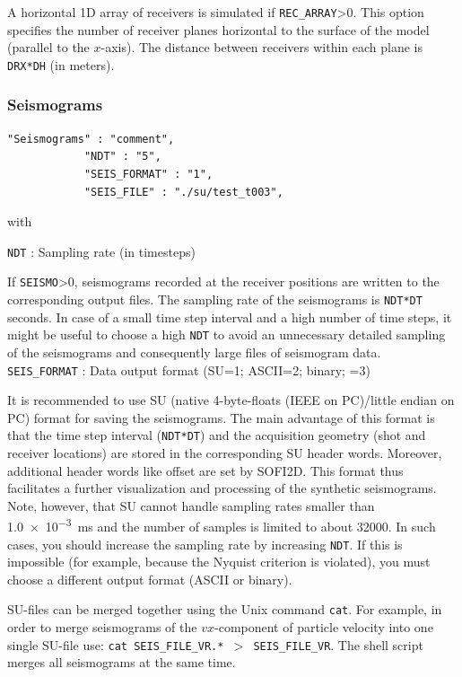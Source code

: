 A horizontal 1D array of receivers is simulated if \texttt{REC\_ARRAY}>0. This option specifies the number of receiver planes horizontal to the surface of the model (parallel to the $x$-axis). The distance between receivers within each plane is \texttt{DRX*DH} (in meters).

\subsubsection{Seismograms}
\label{seismograms}
\begin{verbatim}
"Seismograms" : "comment",
            "NDT" : "5",
            "SEIS_FORMAT" : "1",
            "SEIS_FILE" : "./su/test_t003",
\end{verbatim}

with

\texttt{NDT} : Sampling rate (in timesteps)

If \texttt{SEISMO}>0, seismograms recorded at the receiver positions are written to the corresponding output files. The sampling rate of the seismograms is \texttt{NDT*DT} seconds. In case of a small time step interval and a high number of time steps, it might be useful to choose a high \texttt{NDT} to avoid an unnecessary detailed sampling of the seismograms and consequently large files of seismogram data.\\

\texttt{SEIS\_FORMAT} : Data output format (SU=1; ASCII=2; binary; =3)

It is recommended to use SU (native 4-byte-floats (IEEE on PC)/little endian on PC) format for saving the seismograms. The main advantage of this format is that the time step interval (\texttt{NDT*DT}) and the acquisition geometry (shot and receiver locations) are stored in the corresponding SU header words. Moreover, additional header words like offset are set by SOFI2D. This format thus facilitates a further visualization and processing of the synthetic seismograms. Note, however, that SU cannot handle sampling rates smaller than \SI{1.0e-3}{ms} and the number of samples is limited to about \SI{32000}{}. In such cases, you should increase the sampling rate by increasing \texttt{NDT}. If this is impossible (for example, because the Nyquist criterion is violated), you must choose a different output format (ASCII or binary). 

SU-files can be merged together using the Unix command \texttt{cat}. For example, in order to merge seismograms of the $vx$-component of particle velocity into one single SU-file use: \texttt{cat SEIS\_FILE\_VR.* $>$ SEIS\_FILE\_VR}. The shell script  merges all seismograms at the same time.\\

